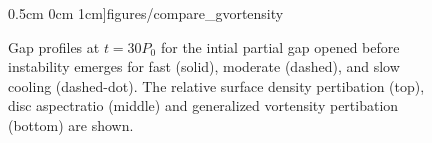 \begin{figure}
    0.5cm 0cm 1cm]{figures/compare_gvortensity}
  \caption{Gap profiles at $t=30P_0$ for the intial partial gap opened
    before instability emerges for fast (solid), moderate
    (dashed), and slow cooling (dashed-dot). The relative surface density
    pertibation (top), disc aspectratio (middle) and generalized
    vortensity pertibation (bottom) are shown. \label{intial1D}}  
\end{figure}




